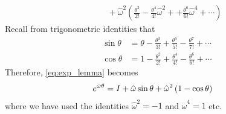 \begin{solution}
\begin{align}
	&\quad + \hat{\omega}^2 \left( \frac{\theta^2}{2!} - \frac{\theta^4}{4!}\hat{\omega}^2 + + \frac{\theta^6}{6!}\hat{\omega}^4  + \cdots \right)
	\label{eq:exp_lemma}
	\end{align}
	Recall from trigonometric identities that 
	\begin{subequations}
		\begin{align}
		\sin \theta &= \theta - \frac{\theta^3}{3!}  + \frac{\theta^5}{5!} - \frac{\theta^7}{7!}  + \cdots  \nonumber \\
		\cos \theta		&= 1 - \frac{\theta^2}{2!} + \frac{\theta^4}{4!} - \frac{\theta^6}{6!} + \cdots
		\end{align}
	\end{subequations}
%
Therefore, \eqref{eq:exp_lemma} becomes 
%
	\begin{align}
		e^{\hat{\omega}\theta} &= I + \hat{\omega} \sin \theta + \hat{\omega}^2\left(1-\cos \theta \right)
	\end{align}
	where we have used the identities $\hat{\omega}^2 = -1$ and $\hat{\omega}^4 = 1$ etc.
\end{solution}

